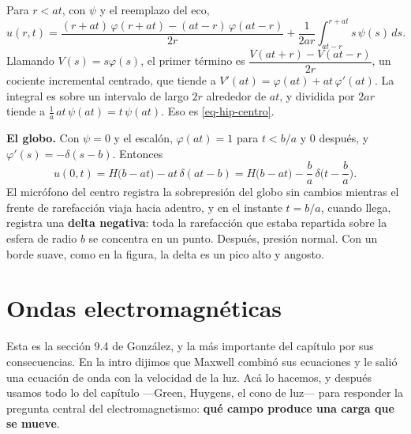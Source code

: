 \documentclass[
  spanish,
  a4paper,
]{scrbook}
\theoremstyle{definition}
\theoremstyle{plain}
\theoremstyle{definition}
\theoremstyle{plain}
\theoremstyle{definition}
\theoremstyle{remark}
\begin{document}
\begin{tcolorbox}[enhanced jigsaw, arc=.35mm, bottomrule=.15mm, bottomtitle=1mm, breakable, colback=white, colbacktitle=quarto-callout-tip-color!10!white, colframe=quarto-callout-tip-color-frame, coltitle=black, left=2mm, leftrule=.75mm, opacityback=0, opacitybacktitle=0.6, rightrule=.15mm, title=\textcolor{quarto-callout-tip-color}{\faLightbulb}\hspace{0.5em}{Solución}, titlerule=0mm, toprule=.15mm, toptitle=1mm]

Para \(r<at\), con \(\psi\) y el reemplazo del eco, \[
u(r,t) = \frac{(r+at)\,\varphi(r+at) - (at-r)\,\varphi(at-r)}{2r} + \frac{1}{2ar}\int_{at-r}^{r+at}s\,\psi(s)\,ds .
\] Llamando \(V(s) = s\varphi(s)\), el primer término es
\(\dfrac{V(at+r) - V(at-r)}{2r}\), un cociente incremental centrado, que
tiende a \(V'(at) = \varphi(at) + at\,\varphi'(at)\). La integral es
sobre un intervalo de largo \(2r\) alrededor de \(at\), y dividida por
\(2ar\) tiende a \(\tfrac1a\,at\,\psi(at) = t\,\psi(at)\). Eso es
\ref{eq-hip-centro}.

\textbf{El globo.} Con \(\psi = 0\) y el escalón, \(\varphi(at) = 1\)
para \(t<b/a\) y \(0\) después, y \(\varphi'(s) = -\delta(s-b)\).
Entonces \[
u(0,t) = H\big(b - at\big) - at\,\delta(at - b) = H\big(b-at\big) - \frac{b}{a}\,\delta\!\Big(t - \frac ba\Big).
\] El micrófono del centro registra la sobrepresión del globo sin
cambios mientras el frente de rarefacción viaja hacia adentro, y en el
instante \(t = b/a\), cuando llega, registra una \textbf{delta
negativa}: toda la rarefacción que estaba repartida sobre la esfera de
radio \(b\) se concentra en un punto. Después, presión normal. Con un
borde suave, como en la figura, la delta es un pico alto y angosto.

\end{tcolorbox}

\section{Ondas electromagnéticas}\label{sec-hip-maxwell}

Esta es la sección 9.4 de González, y la más importante del capítulo por
sus consecuencias. En la intro dijimos que Maxwell combinó sus
ecuaciones y le salió una ecuación de onda con la velocidad de la luz.
Acá lo hacemos, y después usamos todo lo del capítulo ---Green, Huygens,
el cono de luz--- para responder la pregunta central del
electromagnetismo: \textbf{qué campo produce una carga que se mueve}.
\end{document}
